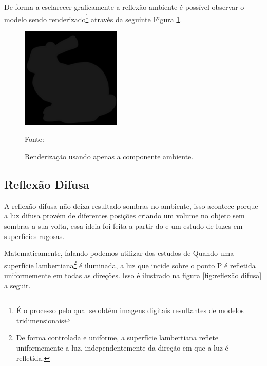 De forma a esclarecer graficamente a reflexão ambiente é possível observar o modelo sendo renderizado\footnote{É o processo pelo qual se obtém imagens digitais resultantes de modelos tridimensionais} através da seguinte Figura \ref{fig:luz-ambiente}.

\begin{figure}[ht]
    \caption{Renderização usando apenas a componente ambiente.}
    \centering
    \includegraphics[scale=0.5]{imagens/09_lighting11.png}

    Fonte: \cite{Harlen_Batagelo2021}
    \label{fig:luz-ambiente}
\end{figure}


\subsection{Reflexão Difusa}

A reflexão difusa não deixa resultado sombras no ambiente, isso acontece porque a luz difusa provém de diferentes posições criando um volume no objeto sem sombras a sua volta, essa ideia foi feita a partir do  e um estudo de luzes em superfícies rugosas.

Matematicamente, falando podemos utilizar dos estudos de \cite{SteveMarschner584} Quando uma superfície lambertiana\footnote{De forma controlada e uniforme, a superfície lambertiana reflete uniformemente a luz, independentemente da direção em que a luz é refletida. } é iluminada, a luz que incide sobre o ponto P é refletida uniformemente em todas as direções.  Isso é ilustrado na figura \ref{fig:reflexão difusa} a seguir.

